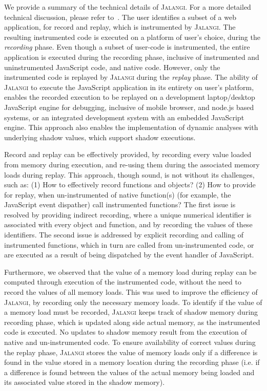 \documentclass{sig-alternate}
\def\jalangi{\textsc{Jalangi}}
\begin{document}
We provide a summary of the technical details of \jalangi{}.  For a 
more detailed technical discussion, please refer to~\cite{SBGKfse13}.
The user identifies a subset of a web application, for record and
replay, which is instrumented by \jalangi{}. The resulting instrumented
code is executed on a platform of user's choice, during the 
\emph{recording} phase.  Even though a subset of user-code is 
instrumented, the entire application is executed during the recording
phase, inclusive of instrumented and uninstrumented JavaScript code, 
and native code. However, only the instrumented code is replayed 
by \jalangi{} during the \emph{replay} phase.  The ability of \jalangi{}
to execute the JavaScript application in its entirety on user's 
platform, enables the recorded execution to be replayed on a development
laptop/desktop JavaScript engine for debugging, inclusive of mobile browser,
and node.js based systems, or an integrated development system with an
embedded JavaScript engine.  This approach also enables the implementation
of dynamic analyses with underlying shadow values, which support shadow
executions.  

Record and replay can be effectively provided, by recording every
value loaded from memory during execution, and re-using them during
the associated memory loads during replay.  This approach, though
sound, is not without its challenges, such as: (1) How to effectively
record functions and objects? (2) How to provide for replay, when
un-instrumented of native function(s) (for example, the JavaScript
event dispather) call instrumented functions?  The first issue is
resolved by providing indirect recording, where a unique numerical
identifier is associated with every object and function, and by
recording the values of these identifiers.  The second issue is
addressed by explicit recording and calling of instrumented functions,
which in turn are called from un-instrumented code, or are executed as
a result of being dispatched by the event handler of JavaScript.

Furthermore, we observed that the value of a memory load during replay
can be computed through execution of the instrumented code, without
the need to record the values of all memory loads.  This was used to
improve the efficiency of \jalangi{}, by recording only the necessary
memory loads.  To identify if the value of a memory load must be
recorded, \jalangi{} keeps track of shadow memory during recording
phase, which is updated along side actual memory, as the instrumented
code is executed.  No updates to shadow memory result from the
execution of native and un-instrumented code.  To ensure availability
of correct values during the replay phase, \jalangi{} stores the value
of memory loads only if a difference is found in the value stored in a
memory location during the recording phase (i.e. if a difference is
found between the values of the actual memory being loaded and its
associated value stored in the shadow memory).
\end{document}
